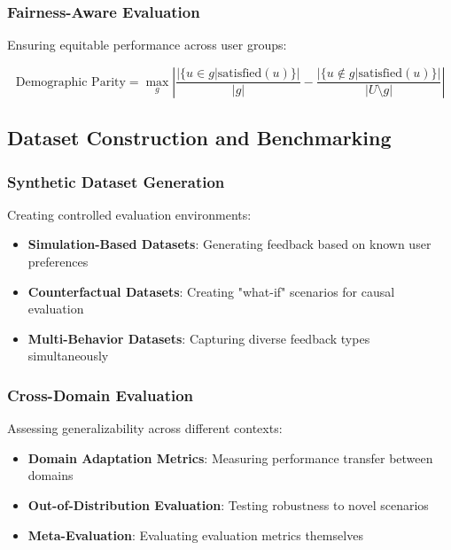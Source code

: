 \documentclass[acmsmall,review,anonymous]{acmart}
\begin{document}
\subsubsection{Fairness-Aware Evaluation}

Ensuring equitable performance across user groups:

\begin{equation}
\text{Demographic Parity} = \max_g \left| \frac{|\{u \in g | \text{satisfied}(u)\}|}{|g|} - \frac{|\{u \notin g | \text{satisfied}(u)\}|}{|U \setminus g|} \right|
\label{eq:demographic_parity}
\end{equation}

\subsection{Dataset Construction and Benchmarking}

\subsubsection{Synthetic Dataset Generation}

Creating controlled evaluation environments:

\begin{itemize}
    \item \textbf{Simulation-Based Datasets}: Generating feedback based on known user preferences
    \item \textbf{Counterfactual Datasets}: Creating "what-if" scenarios for causal evaluation
    \item \textbf{Multi-Behavior Datasets}: Capturing diverse feedback types simultaneously
\end{itemize}

\subsubsection{Cross-Domain Evaluation}

Assessing generalizability across different contexts:

\begin{itemize}
    \item \textbf{Domain Adaptation Metrics}: Measuring performance transfer between domains
    \item \textbf{Out-of-Distribution Evaluation}: Testing robustness to novel scenarios
    \item \textbf{Meta-Evaluation}: Evaluating evaluation metrics themselves
\end{itemize}
\end{document}
